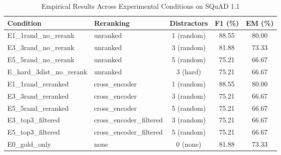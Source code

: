 \begin{table}[htbp]
\centering
\caption{Empirical Results Across Experimental Conditions on SQuAD 1.1}
\label{tab:main_results}
\begin{tabular}{llccc}
\hline
\textbf{Condition} & \textbf{Reranking} & \textbf{Distractors} & \textbf{F1 (\%)} & \textbf{EM (\%)} \\
\hline
E1\_1rand\_no\_rerank & unranked & 1 (random) & 88.55 & 80.00 \\
E3\_3rand\_no\_rerank & unranked & 3 (random) & 81.88 & 73.33 \\
E5\_5rand\_no\_rerank & unranked & 5 (random) & 75.21 & 66.67 \\
E\_hard\_3dist\_no\_rerank & unranked & 3 (hard) & 75.21 & 66.67 \\
E1\_1rand\_reranked & cross\_encoder & 1 (random) & 88.55 & 80.00 \\
E3\_3rand\_reranked & cross\_encoder & 3 (random) & 75.21 & 66.67 \\
E5\_5rand\_reranked & cross\_encoder & 5 (random) & 75.21 & 66.67 \\
E3\_top3\_filtered & cross\_encoder\_filtered & 3 (random) & 75.21 & 66.67 \\
E5\_top3\_filtered & cross\_encoder\_filtered & 5 (random) & 75.21 & 66.67 \\
E0\_gold\_only & none & 0 (none) & 81.88 & 73.33 \\
\hline
\end{tabular}
\end{table}